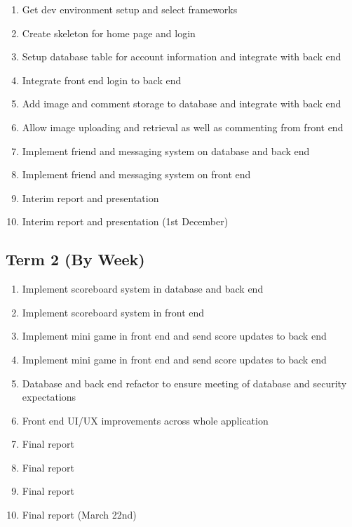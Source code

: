 \documentclass{article}
\begin{document}
\begin{enumerate}
    \item Get dev environment setup and select frameworks
    \item Create skeleton for home page and login
    \item Setup database table for account information and integrate with back end
    \item Integrate front end login to back end
    \item Add image and comment storage to database and integrate with back end
    \item Allow image uploading and retrieval as well as commenting from front end
    \item Implement friend and messaging system on database and back end
    \item Implement friend and messaging system on front end
    \item Interim report and presentation
    \item Interim report and presentation (1st December)
\end{enumerate}

\subsection{Term 2 (By Week)}

\begin{enumerate}
    \item Implement scoreboard system in database and back end
    \item Implement scoreboard system in front end
    \item Implement mini game in front end and send score updates to back end
    \item Implement mini game in front end and send score updates to back end
    \item Database and back end refactor to ensure meeting of database and security expectations
    \item Front end UI/UX improvements across whole application
    \item Final report
    \item Final report
    \item Final report
    \item Final report (March 22nd)
\end{enumerate}
\end{document}
